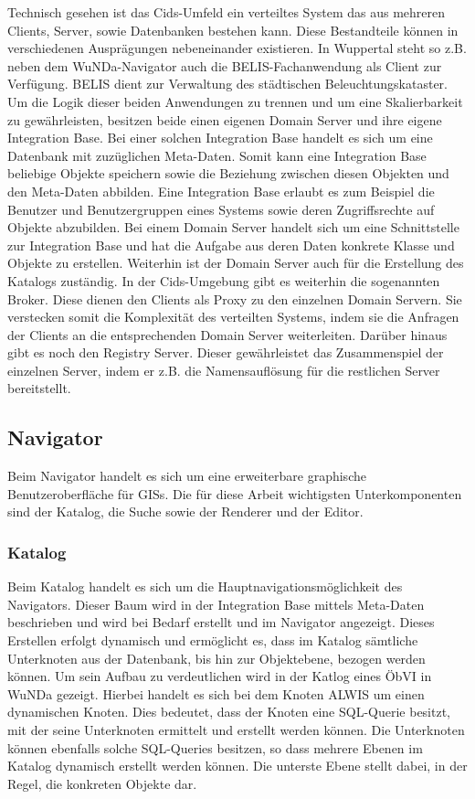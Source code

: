 Technisch gesehen ist das Cids-Umfeld ein verteiltes System das aus mehreren Clients, Server, sowie Datenbanken bestehen kann.
Diese Bestandteile können in verschiedenen Ausprägungen nebeneinander existieren.
In Wuppertal steht so z.B. neben dem \ac{WuNDa}-Navigator auch die BELIS-Fachanwendung als Client zur Verfügung. BELIS dient zur Verwaltung des städtischen Beleuchtungskataster.
Um die Logik dieser beiden Anwendungen zu trennen und um eine Skalierbarkeit zu gewährleisten, besitzen beide einen eigenen Domain Server und ihre eigene Integration Base.
Bei einer solchen Integration Base handelt es sich um eine Datenbank mit zuzüglichen Meta-Daten.
Somit kann eine Integration Base beliebige Objekte speichern sowie die Beziehung zwischen diesen Objekten und den Meta-Daten abbilden.
Eine Integration Base erlaubt es zum Beispiel die Benutzer und Benutzergruppen eines Systems sowie deren Zugriffsrechte auf Objekte abzubilden.
Bei einem Domain Server handelt sich um eine Schnittstelle zur Integration Base und hat die Aufgabe aus deren Daten konkrete Klasse und Objekte zu erstellen. Weiterhin ist der Domain Server auch für die Erstellung des Katalogs zuständig. 
In der Cids-Umgebung gibt es weiterhin die sogenannten Broker. Diese dienen den Clients als Proxy zu den einzelnen Domain Servern. Sie verstecken somit die Komplexität des verteilten Systems, indem sie die Anfragen der Clients an die entsprechenden Domain Server weiterleiten.
Darüber hinaus gibt es noch den Registry Server. Dieser gewährleistet das Zusammenspiel der einzelnen Server, indem er z.B. die Namensauflösung für die restlichen Server bereitstellt.

\subsection{Navigator}
Beim Navigator handelt es sich um eine erweiterbare graphische Benutzeroberfläche für \acp{GIS}. Die für diese Arbeit wichtigsten Unterkomponenten sind der Katalog, die Suche sowie der Renderer und der Editor.

\subsubsection{Katalog}
Beim Katalog handelt es sich um die Hauptnavigationsmöglichkeit des Navigators.
Dieser Baum wird in der Integration Base mittels Meta-Daten beschrieben und wird bei Bedarf erstellt und im Navigator angezeigt.
Dieses Erstellen erfolgt dynamisch und ermöglicht es, dass im Katalog sämtliche Unterknoten aus der Datenbank, bis hin zur Objektebene, bezogen werden können.
Um sein Aufbau zu verdeutlichen wird in  der Katlog eines \ac{ÖbVI} in \ac{WuNDa} gezeigt.
Hierbei handelt es sich bei dem Knoten \ac{ALWIS} um einen dynamischen Knoten.
Dies bedeutet, dass der Knoten eine SQL-Querie besitzt, mit der seine Unterknoten ermittelt und erstellt werden können.
Die Unterknoten können ebenfalls solche SQL-Queries besitzen, so dass mehrere Ebenen im Katalog dynamisch erstellt werden können.
Die unterste Ebene stellt dabei, in der Regel, die konkreten Objekte dar.

